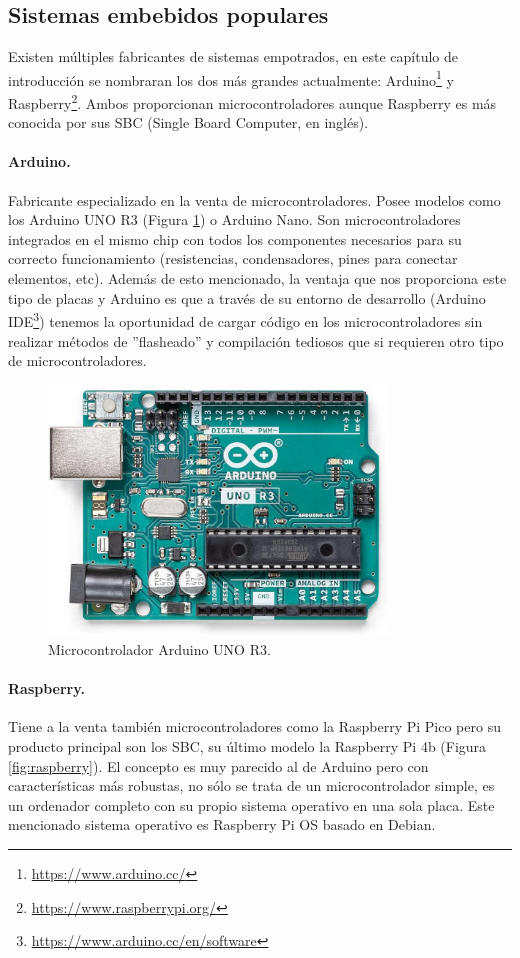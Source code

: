 \subsection{Sistemas embebidos populares}
Existen múltiples fabricantes de sistemas empotrados, en este capítulo de introducción se nombraran los dos más grandes actualmente: Arduino\footnote{\url{https://www.arduino.cc/}} y Raspberry\footnote{\url{https://www.raspberrypi.org/}}. Ambos proporcionan microcontroladores aunque Raspberry es más conocida por sus SBC (Single Board Computer, en inglés).

\paragraph{Arduino.} Fabricante especializado en la venta de microcontroladores. Posee modelos como los Arduino UNO R3 (Figura \ref{fig:arduino_uno}) o Arduino Nano. Son microcontroladores integrados en el mismo chip con todos los componentes necesarios para su correcto funcionamiento (resistencias, condensadores, pines para conectar elementos, etc). Además de esto mencionado, la ventaja que nos proporciona este tipo de placas y Arduino es que a través de su entorno de desarrollo (Arduino IDE\footnote{\url{https://www.arduino.cc/en/software}}) tenemos la oportunidad de cargar código en los microcontroladores sin realizar métodos de ''flasheado'' y compilación tediosos que si requieren otro tipo de microcontroladores.

\begin{figure} [h!]
  \begin{center}
    \includegraphics[width=9cm]{figs/arduino.jpg}
  \end{center}
  \caption{Microcontrolador Arduino UNO R3.}
  \label{fig:arduino_uno}
\end{figure}

\paragraph{Raspberry.} Tiene a la venta también microcontroladores como la Raspberry Pi Pico pero su producto principal son los SBC, su último modelo la Raspberry Pi 4b (Figura \ref{fig:raspberry}). El concepto es muy parecido al de Arduino pero con características más robustas, no sólo se trata de un microcontrolador simple, es un ordenador completo con su propio sistema operativo en una sola placa. Este mencionado sistema operativo es Raspberry Pi OS basado en Debian.

